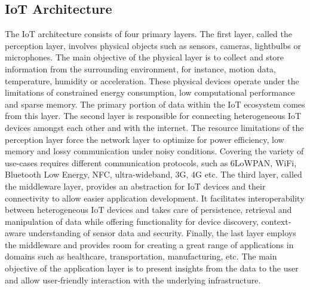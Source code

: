 \documentclass[conference, 11pt]{IEEEtran}
\begin{document}
\subsection{IoT Architecture}
The IoT architecture consists of four primary layers.
The first layer, called the perception layer, involves physical objects such as sensors, cameras, lightbulbs or microphones.
The main objective of the physical layer is to collect and store information from the surrounding environment, for instance, motion data, temperature, humidity or acceleration.
These physical devices operate under the limitations of constrained energy consumption, low computational performance and sparse memory.
The primary portion of data within the IoT ecosystem comes from this layer.
The second layer is responsible for connecting heterogeneous IoT devices amongst each other and with the internet.
The resource limitations of the perception layer force the network layer to optimize for power efficiency, low memory and lossy communication under noisy conditions.
Covering the variety of use-cases requires different communication protocols, such as 6LoWPAN, WiFi, Bluetooth Low Energy, NFC, ultra-wideband, 3G, 4G etc.
The third layer, called the middleware layer, provides an abstraction for IoT devices and their connectivity to allow easier application development.
It facilitates interoperability between heterogeneous IoT devices and takes care of persistence, retrieval and manipulation of data while offering functionality for device discovery, context-aware understanding of sensor data and security.
Finally, the last layer employs the middleware and provides room for creating a great range of applications in domains such as healthcare, transportation, manufacturing, etc.
The main objective of the application layer is to present insights from the data to the user and allow user-friendly interaction with the underlying infrastructure.
\end{document}
